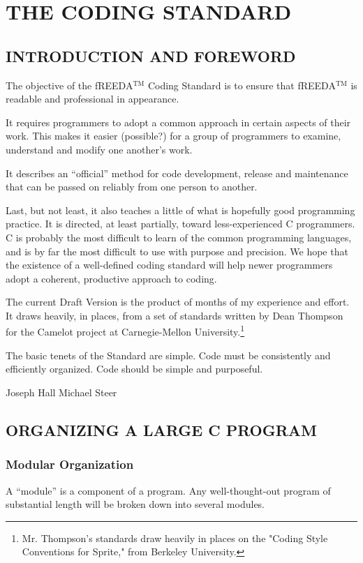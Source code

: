 \chapter{THE CODING STANDARD}

\section{INTRODUCTION AND FOREWORD}

The objective of the fREEDA$^{\mathrm{TM}}$ Coding Standard is to ensure that fREEDA$^{\mathrm{TM}}$
is readable and professional in appearance.

It requires programmers to adopt a common approach in certain aspects
of their work.  This makes it easier (possible?) for a group of
programmers to examine, understand and modify one another's work.

It describes an ``official'' method for code development, release and
maintenance that can be passed on reliably from one person to another.

Last, but not least, it also teaches a little of what is hopefully
good programming practice.  It is directed, at least partially, toward
less-experienced C programmers.  C is probably the most difficult to
learn of the common programming languages, and is by far the most
difficult to use with purpose and precision.  We hope that the
existence of a well-defined coding standard will help newer
programmers adopt a coherent, productive approach to coding.

The current Draft Version is the product of months of my experience
and effort.  It draws heavily, in places, from a set of standards
written by Dean Thompson for the Camelot project at Carnegie-Mellon
University.\footnote{Mr.  Thompson's standards draw heavily in places
on the "Coding Style Conventions for Sprite," from Berkeley
University.}

The basic tenets of the Standard are simple.  Code must be
consistently and efficiently organized.  Code should be simple and
purposeful.
\vspace{0.125 in}

Joseph Hall\vspace{.10 in}
\hfill
Michael Steer

\newpage
\section{ORGANIZING A LARGE C PROGRAM}
\subsection{Modular Organization}
A ``module'' is a component of a program.  Any well-thought-out
program of substantial length will be broken down into several
modules.

